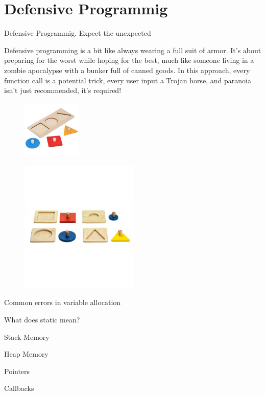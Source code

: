 \documentclass[10pt]{beamer}
\begin{document}
\section{Defensive Programmig}

\begin{frame}{Defensive Programmig. Expect the unexpected}
  
Defensive programming is a bit like always wearing a full suit of armor. It’s about preparing for the worst while hoping for the best, much like someone living in a zombie apocalypse with a bunker full of canned goods. In this approach, every function call is a potential trick, every user input a Trojan horse, and paranoia isn’t just recommended, it’s required!

\begin{figure}[h]
  \centering
  \includegraphics[width=0.25\textwidth]{figures/BadDummpyProof.png}
  \label{fig:BadDummpyProof}
\end{figure}

\begin{figure}[h]
  \centering
  \includegraphics[width=0.5\textwidth]{figures/GoodDummyProof.png}
  \label{fig:BadDummpyProof}
\end{figure}

\end{frame}


\begin{frame}{Common errors in variable allocation}

\end{frame}

\begin{frame}{What does static mean?}

\end{frame}

\begin{frame}{Stack Memory}

\end{frame}

\begin{frame}{Heap Memory}

\end{frame}

\begin{frame}{Pointers}

\end{frame}

\begin{frame}{Callbacks}

\end{frame}
\end{document}
